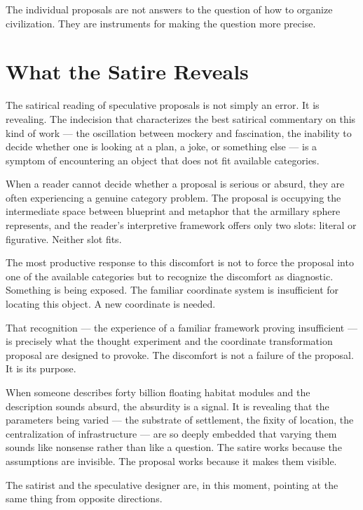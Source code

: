 \documentclass[12pt, a4paper]{article}
\theoremstyle{named}
\begin{document}
The individual proposals are not answers to the question of how to
organize civilization. They are instruments for making the question
more precise.

\section{What the Satire Reveals}

The satirical reading of speculative proposals is not simply an error.
It is revealing. The indecision that characterizes the best satirical
commentary on this kind of work — the oscillation between mockery and
fascination, the inability to decide whether one is looking at a plan, a
joke, or something else — is a symptom of encountering an object that
does not fit available categories.

When a reader cannot decide whether a proposal is serious or absurd,
they are often experiencing a genuine category problem. The proposal is
occupying the intermediate space between blueprint and metaphor that the
armillary sphere represents, and the reader's interpretive framework
offers only two slots: literal or figurative. Neither slot fits.

The most productive response to this discomfort is not to force the
proposal into one of the available categories but to recognize the
discomfort as diagnostic. Something is being exposed. The familiar
coordinate system is insufficient for locating this object. A new
coordinate is needed.

That recognition — the experience of a familiar framework proving
insufficient — is precisely what the thought experiment and the
coordinate transformation proposal are designed to provoke. The
discomfort is not a failure of the proposal. It is its purpose.

When someone describes forty billion floating habitat modules and the
description sounds absurd, the absurdity is a signal. It is revealing
that the parameters being varied — the substrate of settlement, the
fixity of location, the centralization of infrastructure — are so
deeply embedded that varying them sounds like nonsense rather than like
a question. The satire works because the assumptions are invisible.
The proposal works because it makes them visible.

The satirist and the speculative designer are, in this moment, pointing
at the same thing from opposite directions.
\end{document}
